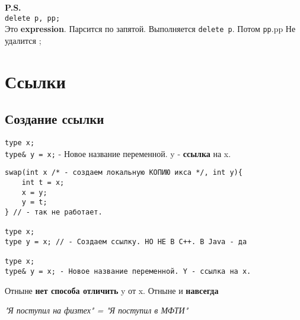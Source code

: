 \documentclass[12pt, a5paper]{article}
\begin{document}
\textbf{P.S.}
\\
\texttt{delete p, pp;}
\\
Это \textbf{expression}. Парсится по запятой. Выполняется \texttt{delete p}. Потом \texttt{pp}.pp Не удалится ;

\section{Ссылки}
\subsection{Создание ссылки}

\texttt{type x;}
\\
\texttt{type\& y = x;} - Новое название переменной. y - \textbf{ссылка} на x.

\begin{lstlisting}
swap(int x /* - создаем локальную КОПИЮ икса */, int y){
	int t = x;
	x = y;
	y = t;
} // - так не работает.

type x;
type y = x; // - Создаем ссылку. НО НЕ В С++. В Java - да 

type x;
type& y = x; - Новое название переменной. Y - ссылка на x. 
\end{lstlisting}
\begin{center}
Отныне \textbf{нет способа отличить} y от x. Отныне и \textbf{навсегда}

\textit{"Я поступил на физтех" = "Я поступил в МФТИ"}

\end{center}
\end{document}
